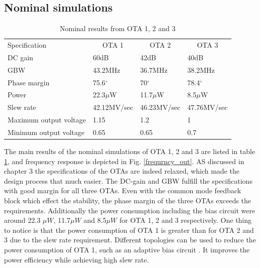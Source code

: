 \subsection{Nominal simulations}

\begin{table}[h]
\centering
\caption{Nominal results from OTA 1, 2 and 3}
\label{nominal_ota}
\begin{tabular}{l|l|l|l}
\hline
\multirow{1}{*}{Specification} & \multicolumn{1}{c|}{OTA 1} & \multicolumn{1}{c|}{OTA 2} & \multicolumn{1}{c}{OTA 3}  \\\cline{1-4}
                       
            DC gain       & 60dB & 42dB & 40dB\\
            GBW      & 43.2MHz & 36.7MHz & 38.2MHz\\
            Phase margin     & 75.6$^\circ$ & 70$^\circ$ & 78.4$^\circ$\\
            Power    & 22.3$\mu$W & 11.7$\mu$W & 8.5$\mu$W\\
            Slew rate   & 42.12MV/sec & 46.23MV/sec & 47.76MV/sec\\
            Maximum output voltage    & 1.15 & 1.2 & 1\\
            Minimum output voltage     & 0.65 & 0.65 & 0.7\\
            
\hline            
\end{tabular}
\end{table}

The main results of the nominal simulations of OTA 1, 2 and 3 are listed in table \ref{nominal_ota}, and frequency response is depicted in Fig. \ref{frequrncy_out}. AS discussed in chapter 3 the specifications of the OTAs are indeed relaxed, which made the design process that much easier. The DC-gain and GBW fulfill the specifications with good margin for all three OTAs. Even with the common mode feedback block which effect the stability, the phase margin of the three OTAs exceeds the requirements. Additionally the power consumption including the bias circuit were around 22.3 $\mu W$, 11.7$\mu W$ and 8.5$\mu W$ for OTA 1, 2 and 3 respectively. One thing to notice is that the power consumption of OTA 1 is greater than for OTA 2 and 3 due to the slew rate requirement. Different topologies can be used to reduce the power consumption of OTA 1, such as an adaptive bias circuit \cite{adaptive}. It improves the power efficiency while achieving high slew rate. 

